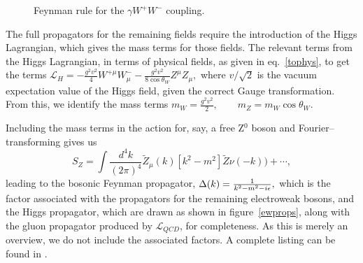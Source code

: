\begin{figure}[htbp]
\begin{minipage}[b]{.69\textwidth}\centering\footnotesize
{}
\end{minipage}\hfill
\begin{minipage}[b]{.3\textwidth}
\caption{Feynman rule for the $\gamma W^{+}W^{-}$ coupling.}
\label{wwgam}
\end{minipage}
\end{figure}

The full propagators for the remaining fields require the introduction of the Higgs Lagrangian, which gives the mass terms for those fields. The relevant terms from the Higgs Lagrangian, in terms of physical fields, as given in eq.~\eqref{tophys}, to get the terms
\(\mathcal{L}_H=-\frac{g^2v^2}{4}W^{+\mu}W^{-}_\mu-\frac{g^2v^2}{8\cos\theta_W}Z^\mu Z_\mu,\)
where $v/\sqrt{2}$ is the vacuum expectation value of the Higgs field, given the correct Gauge transformation. From this, we identify the mass terms
\(m_W=\frac{g^2v^2}{2},\qquad m_Z=m_W\cos\theta_W.\)

Including the mass terms in the action for, say, a free Z$^0$ boson and Fourier--transforming gives us
\[S_Z=\int\frac{d^4k}{(2\pi)^4}\tilde Z_\mu(k)[k^2-m^2]\tilde Z\nu(-k)) +\cdots,\]
leading to the bosonic Feynman propagator,
\(\Delta(k)=\frac{1}{k^2-m^2-i\epsilon},\)
which is the factor associated with the propagators for the remaining electroweak bosons, and the Higgs propagator, which are drawn as shown in figure~\ref{ewprops}, along with the gluon propagator produced by $\mathcal{L}_\textit{QCD}$, for completeness. As this is merely an overview, we do not include the associated factors. A complete listing can be found in \cite{allfrules}.

